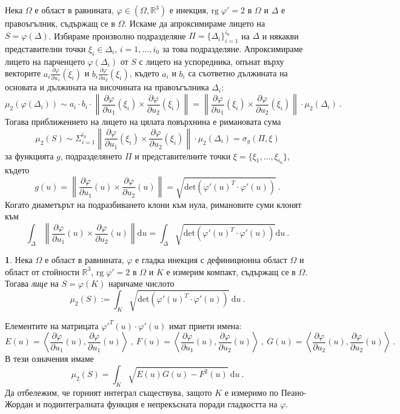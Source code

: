 \documentclass[11pt]{article}
\numberwithin{equation}{section}
\numberwithin{figure}{section}
\numberwithin{table}{section}
\theoremstyle{plain}
\theoremstyle{definition}
\newtheorem{defn}[thm]{\protect\definitionname}
\theoremstyle{remark}
\theoremstyle{definition}
\theoremstyle{remark}
\theoremstyle{plain}
\theoremstyle{definition}
\theoremstyle{definition}
\theoremstyle{plain}
\theoremstyle{plain}
\theoremstyle{plain}
\theoremstyle{definition}
\theoremstyle{plain}
\providecommand{\definitionname}{Дефиниция}
\newcommand*{\R}{\mathbb{R}}
\begin{document}
\bigskip

Нека $\Omega$ е област в равнината, $\varphi\in (\Omega ,\R^3)$ е инекция, $\textrm{rg}\; \varphi'=2$ в $\Omega$ и $\Delta$ е правоъгълник, съдържащ се в $\Omega$. Искаме да апроксимираме лицето на $S=\varphi(\Delta)$. Избираме произволно подразделяне $\Pi =\{ \Delta_i\}_{i=1}^{i_0}$ на $\Delta$ и някакви представителни точки $\xi_i\in \Delta_i$, $i=1,\dots ,i_0$ за това подразделяне. Апроксимираме лицето на парченцето $\varphi(\Delta_i)$ от $S$ с лицето на успоредника, опънат върху векторите $a_i\frac{\partial\varphi}{\partial u_1}(\xi_i)$ и $b_i\frac{\partial\varphi}{\partial u_2}(\xi_i)$, където $a_i$ и $b_i$ са съответно дължината на основата и дължината на височината на правоъгълника $\Delta_i$:
$$\mu_2(\varphi(\Delta_i))\sim a_i \cdot b_i \cdot \left\| \frac{\partial\varphi}{\partial u_1}(\xi_i) \times \frac{\partial\varphi}{\partial u_2}(\xi_i)\right\| = \left\| \frac{\partial\varphi}{\partial u_1}(\xi_i) \times \frac{\partial\varphi}{\partial u_2}(\xi_i)\right\| \cdot \mu_2(\Delta_i) \ .$$
Тогава приближението на лицето на цялата повърхнина е римановата сума
$$\mu_2(S) \sim \Sigma_{i=1}^{i_0}\left\| \frac{\partial\varphi}{\partial u_1}(\xi_i) \times \frac{\partial\varphi}{\partial u_2}(\xi_i)\right\| \cdot \mu_2(\Delta_i) =\sigma_g(\Pi ,\xi )$$
за функцията $g$, подразделянето $\Pi$ и представителните точки $\xi =\{ \xi_1, \dots ,\xi_{i_0}\}$, където
$$g(u)=\left\| \frac{\partial\varphi}{\partial u_1}(u) \times \frac{\partial\varphi}{\partial u_2}(u)\right\| = \sqrt{\textrm{det} \left( {\varphi'}(u)^T \cdot\varphi'(u)\right)} \ .$$
Когато диаметърът на подразбиването клони към нула, римановите суми клонят към
$$\int_\Delta \left\| \frac{\partial\varphi}{\partial u_1}(u) \times \frac{\partial\varphi}{\partial u_2}(u)\right\| \textrm{d}u = \int_\Delta \sqrt{\textrm{det} \left( {\varphi'}(u)^T \cdot\varphi'(u)\right)}\textrm{d}u \ .$$

\begin{defn}
Нека $\Omega$ е област в равнината, $\varphi$ е гладка инекция с дефиниционна област $\Omega$ и област от стойности $\R^3$, $\textrm{rg}\; \varphi'=2$ в $\Omega$ и $K$ е измерим компакт, съдържащ се в $\Omega$. Тогава \textit{лице} на $S=\varphi (K)$ наричаме числото
$$\mu_2(S):= \int_K \sqrt{\textrm{det} \left( {\varphi'}(u)^T \cdot\varphi'(u)\right)} \ \textrm{d}u \ .$$
\end{defn}

Елементите на матрицата ${\varphi'}^T (u)\cdot\varphi'(u)$ имат приети имена:
$$E(u)=\left\langle\frac{\partial\varphi}{\partial u_1}(u),\frac{\partial\varphi}{\partial u_1}(u)\right\rangle \ , \  F(u)=\left\langle\frac{\partial\varphi}{\partial u_1}(u),\frac{\partial\varphi}{\partial u_2}(u)\right\rangle  \ , \  G(u)=\left\langle\frac{\partial\varphi}{\partial u_2}(u),\frac{\partial\varphi}{\partial u_2}(u)\right\rangle \ .$$
В тези означения имаме
$$\mu_2(S)= \int_K \sqrt{E(u)G(u)-F^2(u)} \ \textrm{d}u \ .$$
Да отбележим, че горният интеграл съществува, защото $K$ е измеримо по Пеано-Жордан и подинтегралната функция е непрекъсната поради гладкостта на $\varphi$.
\end{document}
